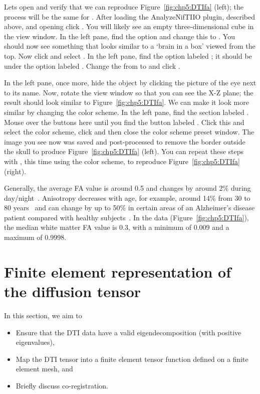 \noindent Lets open  and verify that we can reproduce 
Figure~\ref{fig:chp5:DTIfa} (left); the process will be the same for 
.  After loading the AnalyzeNifTIIO plugin, described above, 
and opening  click .  You will likely see an 
empty three-dimensional cube in the view window.  In the left pane, 
find the  option and change this to .  You 
should now see something that looks similar to a `brain in a box' viewed from 
the top. Now click  and select 
.  In the left pane, find the option labeled ; it 
should be under the option labeled .  Change the  
from  to  and click .  

In the left pane, once more, hide the object  by clicking the 
picture of the eye next to its name.  Now, rotate the view window so that you 
can see the X-Z plane; the result should look similar to 
Figure~\ref{fig:chp5:DTIfa}.  We can make it look more similar by changing the 
color scheme.  In the left pane, find the section labeled .  Mouse 
over the buttons here until you find the button labeled . 
Click this and select the  color scheme, 
click  and then close the color scheme preset window.  The image 
you see now was saved and post-processed to remove the border outside the 
skull to produce Figure~\ref{fig:chp5:DTIfa} (left).  You can repeat these 
steps with , this time using the  color scheme, to 
reproduce Figure~\ref{fig:chp5:DTIfa} (right).

Generally, the average FA value is around 0.5 and changes by around 2\%
during day/night~\cite{voldsbekk2020evidence}.  Anisotropy decreases
with age, for example, around 14\% from 30 to 80
years~\cite{kochunov2011fractional} and can change by up to
50\% in certain areas of an Alzheimer's disease patient compared with
healthy subjects~\cite{naggara2006diffusion}. In the  data 
(Figure~\ref{fig:chp5:DTIfa}), the median white matter FA value is
0.3, with a minimum of 0.009 and a maximum of 0.9998.

\section{Finite element representation of the diffusion tensor}

In this section, we aim to
\begin{itemize}
\item
  Ensure that the DTI data have a valid eigendecomposition (with positive eigenvalues),
\item
  Map the DTI tensor into a finite element tensor function defined on
  a finite element mesh, and
\item
  Briefly discuss co-registration.
\end{itemize}

